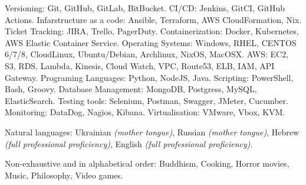 \documentclass[10pt,a4paper]{article} %
\begin{document}
\inlineheadsection %
{Versioning:}
{Git, GitHub, GitLab, BitBucket.}
\inlineheadsection %
{CI/CD:}
{Jenkins, GitCI, GitHub Actions.}
\inlineheadsection %
{Infarstructure as a code:}
{Ansible, Terraform, AWS CloudFormation, Nix.}
\inlineheadsection %
{Ticket Tracking:}
{JIRA, Trello, PagerDuty.}
\inlineheadsection %
{Containerization:}
{Docker, Kubernetes, AWS  Elastic Container Service.}
\inlineheadsection %
{Operating Systems:}
{Windows, RHEL, CENTOS 6/7/8, CloudLinux, Ubuntu/Debian, Archlinux, NixOS, MacOSX.}
\inlineheadsection %
{AWS:}
{EC2, S3, RDS, Lambda, Kinesis, Cloud Watch, VPC, Route53, ELB, IAM, API Gateway.}
\inlineheadsection %
{Programing Languages:}
{Python, NodeJS, Java.}
\inlineheadsection %
{Scripting:}
{PowerShell, Bash, Groovy.}
\inlineheadsection %
{Database Management:}
{MongoDB, Postgress, MySQL, ElasticSearch.}
\inlineheadsection %
{Testing tools:}
{Selenium, Postman, Swagger, JMeter, Cucumber.}
\inlineheadsection %
{Monitoring:}
{DataDog, Nagios, Kibana.}
\inlineheadsection %
{Virtualisation:}
{VMware, Vbox, KVM.}

\roottitle%
{Natural languages:}
{Ukrainian \textit{(mother tongue)}, Russian \textit{(mother tongue)}, Hebrew \textit{(full professional proficiency)}, English \textit{(full professional proficiency)}.}


\spacedhrule{1.6em}{-0.4em} %



\inlineheadsection %
{Non-exhaustive and in alphabetical order:}
{ Buddhism, Cooking, Horror movies, Music, Philosophy, Video games.}

\end{document}
